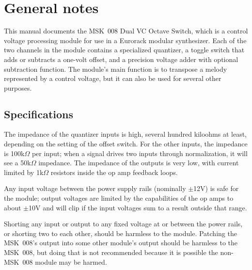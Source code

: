 
%
%
%
%
%
%

\chapter{General notes}

This manual documents the MSK~008 Dual VC Octave Switch, which is a control
voltage processing module for use in a Eurorack modular synthesizer.  Each
of the two channels in the module contains a specialized quantizer, a toggle
switch that adds or subtracts a one-volt offset, and a precision voltage
adder with optional subtraction function.  The module's main function is to
transpose a melody represented by a control voltage, but it can also be used
for several other purposes.

\section{Specifications}

The impedance of the quantizer inputs is high, several hundred kiloohms at
least, depending on the setting of the offset switch.  For the other inputs,
the impedance is 100k$\Omega$ per input; when a signal drives two
inputs through normalization, it will see a 50k$\Omega$ impedance.  The
impedance of the outputs is very low, with current limited by 1k$\Omega$
resistors inside the op amp feedback loops.

Any input voltage between the power supply rails (nominally
$\pm$12V) is safe for the module; output voltages are limited by the
capabilities of the op amps to about $\pm$10V and will clip if the input
voltages sum to a result outside that range.

Shorting any input or output to any fixed voltage at or between the power
rails, or shorting two to each other, should be harmless to the module.
Patching the MSK~008's output into some other module's output should be
harmless to the MSK~008, but doing that is not recommended because it is
possible the non-MSK~008 module may be harmed.

